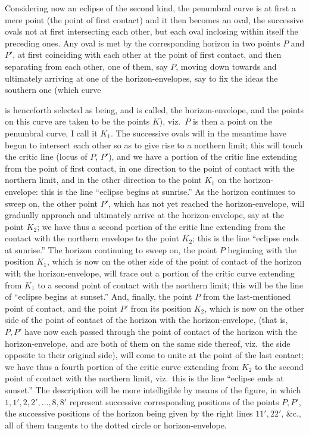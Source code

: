 \documentclass[11pt,a4paper]{article}
\begin{document}
\medskip

Considering now an eclipse of the second kind, the penumbral curve is at first a mere point (the point of first contact) and it then becomes an oval, the successive ovals not at first intersecting each other, but each oval inclosing within itself the preceding ones. Any oval is met by the corresponding horizon in two points $P$ and $P'$, at first coinciding with each other at the point of first contact, and then separating from each other, one of them, say $P$, moving down towards and ultimately arriving at one of the horizon-envelopes, say to fix the ideas the southern one (which curve

\newpage


\noindent is henceforth selected as being, and is called, the horizon-envelope, and the points on this curve are taken to be the points $K$), viz.\ $P$ is then a point on the penumbral curve, I call it $K_{1}$. The successive ovals will in the meantime have begun to intersect each other so as to give rise to a northern limit; this will touch the critic line (locus of $P$, $P'$), and we have a portion of the critic line extending from the point of first contact, in one direction to the point of contact with the northern limit, and in the other direction to the point $K_{1}$ on the horizon-envelope: this is the line ``eclipse begins at sunrise.'' As the horizon continues to sweep on, the other point $P'$, which has not yet reached the horizon-envelope, will gradually approach and ultimately arrive at the horizon-envelope, say at the point $K_{2}$; we have thus a second portion of the critic line extending from the contact with the northern envelope to the point $K_{2}$; this is the line ``eclipse ends at sunrise.'' The horizon continuing to sweep on, the point $P$ beginning with the position $K_{1}$, which is now on the other side of the point of contact of the horizon with the horizon-envelope, will trace out a portion of the critic curve extending from $K_{1}$ to a second point of contact with the northern limit; this will be the line of ``eclipse begins at sunset.'' And, finally, the point $P$ from the last-mentioned point of contact, and the point $P'$ from its position $K_{2}$, which is now on the other side of the point of contact of the horizon with the horizon-envelope, (that is, $P, P'$ have now each passed through the point of contact of the horizon with the horizon-envelope, and are both of them on the same side thereof, viz.\ the side opposite to their original side), will come to unite at the point of the last contact; we have thus a fourth portion of the critic curve extending from $K_{2}$ to the second point of contact with the northern limit, viz.\ this is the line ``eclipse ends at sunset.'' The description will be more intelligible by means of the figure, in which $1, 1', 2, 2', \ldots, 8, 8'$ represent successive corresponding positions of the points $P, P'$, the successive positions of the horizon being given by the right lines $11', 22'$, \&c., all of them tangents to the dotted circle or horizon-envelope.
\end{document}
